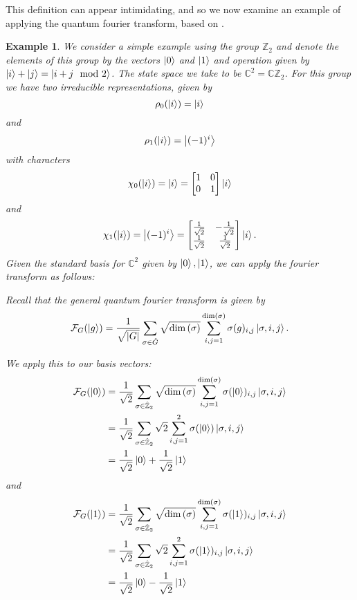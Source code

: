 \documentclass{article}
\renewcommand{\ket}{\Ket}
\theoremstyle{plain}
\theoremstyle{centered}
\newtheorem{example}{Example}
\renewcommand{\ket}{\Ket}
\newcommand{\abs}[1]{\left\lvert #1 \right\rvert}
\renewcommand{\dim}[1]{\textnormal{dim}\left(#1\right)}
\newcommand{\bb}[1]{\mathbb{#1}}
\renewcommand{\cal}[1]{\mathcal{#1}}
\begin{document}
        This definition can appear intimidating, and so we now examine an example of applying the quantum fourier transform, based on \cite{hadfield}.
        \begin{example}
            We consider a simple example using the group $\bb{Z}_2$ and denote the elements of this group by the vectors $\ket{0}$ and $\ket{1}$ and operation given by $\ket{i} + \ket{j} = \ket{i + j \mod 2}$. The state space we take to be $\bb{C}^2 = \bb{C}\bb{Z}_2$.
            For this group we have two irreducible representations, given by
                $$\rho_0(\ket{i}) = \ket{i}$$ 
            and 
                $$\rho_1(\ket{i}) = \ket{(-1)^i}$$
            with characters 
                $$\chi_0(\ket{i}) = \ket{i} = \begin{bmatrix} 1 & 0\\ 0 & 1\end{bmatrix} \ket{i}$$
            and 
                $$\chi_1(\ket{i}) = \ket{(-1)^i} = \begin{bmatrix} \frac{1}{\sqrt{2}} & -\frac{1}{\sqrt{2}}\\ \frac{1}{\sqrt{2}} & \frac{1}{\sqrt{2}}\end{bmatrix} \ket{i}.$$
            Given the standard basis for $\bb{C}^2$ given by $\ket{0}, \ket{1}$, we can apply the fourier transform as follows:

            Recall that the general quantum fourier transform is given by
                $$\cal{F}_G(\ket{g}) = \frac{1}{\sqrt{\abs{G}}} \sum_{\sigma \in \hat{G}} \sqrt{\dim{\sigma}} \sum_{i,j = 1}^{\dim{\sigma}} \sigma(g)_{i,j} \ket{\sigma, i, j}.$$

            We apply this to our basis vectors:
            \begin{align*}
            \cal{F}_G(\ket{0}) &= \frac{1}{\sqrt{2}} \sum_{\sigma \in \hat{\bb{Z}}_2} \sqrt{\dim{\sigma}} \sum_{i,j = 1}^{\dim{\sigma}} \sigma(\ket{0})_{i,j} \ket{\sigma, i, j}\\
            &= \frac{1}{\sqrt{2}} \sum_{\sigma \in \hat{\bb{Z}}_2} \sqrt{2} \sum_{i, j = 1}^2 \sigma(\ket{0}) \ket{\sigma, i, j}\\
            &= \frac{1}{\sqrt{2}} \ket{0} + \frac{1}{\sqrt{2}} \ket{1}
            \end{align*}
            and
            \begin{align*}
            \cal{F}_G(\ket{1}) &= \frac{1}{\sqrt{2}} \sum_{\sigma \in \hat{\bb{Z}}_2} \sqrt{\dim{\sigma}} \sum_{i,j = 1}^{\dim{\sigma}} \sigma(\ket{1})_{i,j} \ket{\sigma, i, j}\\
            &= \frac{1}{\sqrt{2}} \sum_{\sigma \in \hat{\bb{Z}}_2} \sqrt{2} \sum_{i,j = 1}^2 \sigma(\ket{1})_{i,j} \ket{\sigma, i, j}\\
            &= \frac{1}{\sqrt{2}} \ket{0} - \frac{1}{\sqrt{2}} \ket{1}
            \end{align*}
        \end{example}
\end{document}
